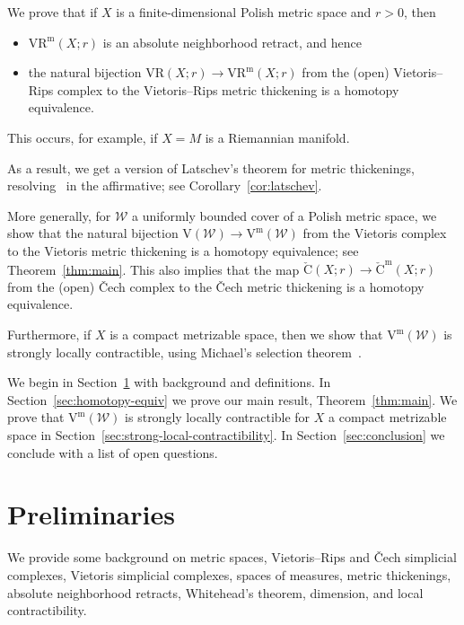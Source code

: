 \documentclass[11pt, reqno, english]{amsart}
\theoremstyle{plain}
\theoremstyle{definition}
\theoremstyle{myremark}
\newcommand{\cW}{\mathcal{W}}
\newcommand{\vr}[2]{\mathrm{VR}(#1;#2)}
\newcommand{\viet}[1]{\mathrm{V}(#1)}
\newcommand{\vietm}[1]{\mathrm{V}^\mathrm{m}(#1)}
\newcommand{\vrm}[2]{\mathrm{VR}^\mathrm{m}(#1;#2)}
\newcommand{\cech}[2]{\mathrm{\check{C}}(#1;#2)}
\newcommand{\cechm}[2]{\mathrm{\check{C}}^\mathrm{m}(#1;#2)}
\begin{document}
We prove that if $X$ is a finite-dimensional Polish metric space and $r>0$, then
\begin{itemize}
\item $\vrm{X}{r}$ is an absolute neighborhood retract, and hence
\item the natural bijection $\vr{X}{r}\to\vrm{X}{r}$ from the (open) Vietoris--Rips complex to the Vietoris--Rips metric thickening is a homotopy equivalence.
\end{itemize}
This occurs, for example, if $X=M$ is a Riemannian manifold.

As a result, we get a version of Latschev's theorem for metric thickenings, resolving~\cite[Conjecture~6.9]{AAR} in the affirmative; see Corollary~\ref{cor:latschev}.

More generally, for $\cW$ a uniformly bounded cover of a Polish metric space, we show that the natural bijection $\viet{\cW}\to\vietm{\cW}$ from the Vietoris complex to the Vietoris metric thickening is a homotopy equivalence; see Theorem~\ref{thm:main}.
This also implies that the map $\cech{X}{r}\to\cechm{X}{r}$ from the (open) \v{C}ech complex to the \v{C}ech metric thickening is a homotopy equivalence.

Furthermore, if $X$ is a compact metrizable space, then we show that $\vietm{\cW}$ is strongly locally contractible, using Michael's selection theorem~\cite{michael1956continuous}.

We begin in Section~\ref{sec:preliminaries} with background and definitions.
In Section~\ref{sec:homotopy-equiv} we prove our main result, Theorem~\ref{thm:main}.
We prove that $\vietm{\cW}$ is strongly locally contractible for $X$ a compact metrizable space in Section~\ref{sec:strong-local-contractibility}.
In Section~\ref{sec:conclusion} we conclude with a list of open questions.







\section{Preliminaries}
\label{sec:preliminaries}

We provide some background on metric spaces, Vietoris--Rips and \v{C}ech simplicial complexes, Vietoris simplicial complexes,  spaces of measures, metric thickenings, absolute neighborhood retracts, Whitehead's theorem, dimension, and local contractibility.
\end{document}

